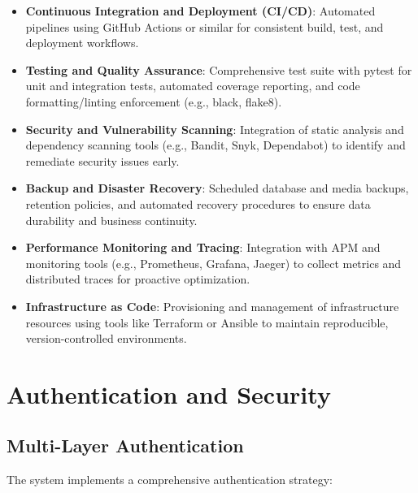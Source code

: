 \begin{itemize}
  \item \textbf{Continuous Integration and Deployment (CI/CD)}: Automated pipelines using GitHub Actions or similar for consistent build, test, and deployment workflows.
  \item \textbf{Testing and Quality Assurance}: Comprehensive test suite with pytest for unit and integration tests, automated coverage reporting, and code formatting/linting enforcement (e.g., black, flake8).
  \item \textbf{Security and Vulnerability Scanning}: Integration of static analysis and dependency scanning tools (e.g., Bandit, Snyk, Dependabot) to identify and remediate security issues early.
  \item \textbf{Backup and Disaster Recovery}: Scheduled database and media backups, retention policies, and automated recovery procedures to ensure data durability and business continuity.
  \item \textbf{Performance Monitoring and Tracing}: Integration with APM and monitoring tools (e.g., Prometheus, Grafana, Jaeger) to collect metrics and distributed traces for proactive optimization.
  \item \textbf{Infrastructure as Code}: Provisioning and management of infrastructure resources using tools like Terraform or Ansible to maintain reproducible, version-controlled environments.
\end{itemize}

\section{Authentication and Security}

\subsection{Multi-Layer Authentication}
The system implements a comprehensive authentication strategy:

